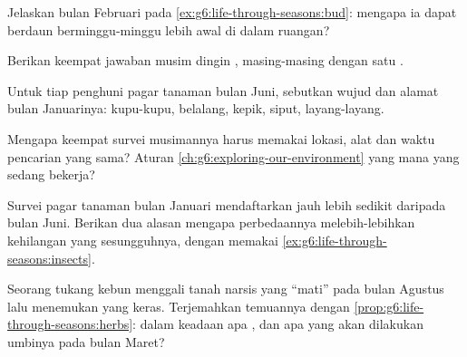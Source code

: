\begin{exercise}[$\star$]\label{exo:g6:life-through-seasons:5}
Jelaskan  bulan Februari pada \cref{ex:g6:life-through-seasons:bud}:
mengapa ia dapat berdaun berminggu-minggu lebih awal di dalam ruangan?
\end{exercise}

\begin{exercise}[$\star$]\label{exo:g6:life-through-seasons:6}
Berikan keempat jawaban musim dingin , masing-masing dengan satu
.
\end{exercise}

\begin{exercise}[$\star\star$]\label{exo:g6:life-through-seasons:7}
Untuk tiap penghuni pagar tanaman bulan Juni, sebutkan wujud dan
alamat bulan Januarinya: kupu-kupu, belalang, kepik, siput, 
layang-layang.
\end{exercise}

\begin{exercise}[$\star\star$]\label{exo:g6:life-through-seasons:8}
Mengapa keempat survei musimannya harus memakai lokasi, alat dan waktu
pencarian yang sama? Aturan \cref{ch:g6:exploring-our-environment}
yang mana yang sedang bekerja?
\end{exercise}

\begin{exercise}[$\star\star$]\label{exo:g6:life-through-seasons:9}
Survei pagar tanaman bulan Januari mendaftarkan  jauh
lebih sedikit daripada bulan Juni. Berikan dua alasan mengapa
perbedaannya melebih-lebihkan kehilangan yang sesungguhnya, dengan
memakai \cref{ex:g6:life-through-seasons:insects}.
\end{exercise}

\begin{exercise}[$\star\star$]\label{exo:g6:life-through-seasons:10}
Seorang tukang kebun menggali tanah  narsis yang ``mati'' pada
bulan Agustus lalu menemukan  yang keras. Terjemahkan
temuannya dengan \cref{prop:g6:life-through-seasons:herbs}: dalam
keadaan apa , dan apa yang akan dilakukan umbinya pada
bulan Maret?
\end{exercise}

